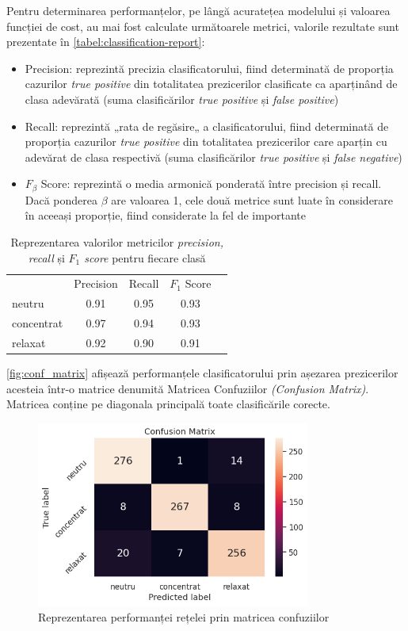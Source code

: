Pentru determinarea performanțelor, pe lângă acuratețea modelului și valoarea funcției de cost, au mai fost calculate următoarele metrici, valorile rezultate sunt prezentate în \autoref{tabel:classification-report}:
\begin{itemize}
\item Precision: reprezintă precizia clasificatorului, fiind determinată de proporția cazurilor \textit{true positive} din totalitatea prezicerilor clasificate ca aparținând de clasa adevărată (suma clasificărilor \textit{true positive} și \textit{false positive})
\item Recall: reprezintă „rata de regăsire„ a clasificatorului, fiind determinată de proporția cazurilor \textit{true positive} din totalitatea prezicerilor care aparțin cu adevărat de clasa respectivă (suma clasificărilor \textit{true positive} și \textit{false negative})
\item $F_\beta$ Score: reprezintă o media armonică ponderată între precision și recall. Dacă ponderea $\beta$ are valoarea 1, cele două metrice sunt luate în considerare în aceeași proporție, fiind considerate la fel de importante
\end{itemize}

\begin{table}[ht]
\centering
\caption{Reprezentarea valorilor metricilor \textit{precision, recall} și \textit{$F_1$ score} pentru fiecare clasă}
\label{tabel:classification-report}
\renewcommand{\arraystretch}{1.2}
\begin{tabular}{@{}lcccc@{}}
\rowcolor{gray!50}\cellcolor{white} & Precision & Recall & $F_1$ Score \\ %
neutru & 0.91 & 0.95 & 0.93 \\
concentrat & 0.97 & 0.94 & 0.93 \\
relaxat & 0.92 & 0.90 & 0.91 \\ \bottomrule
\end{tabular}
\end{table}

\autoref{fig:conf_matrix} afișează performanțele clasificatorului prin așezarea prezicerilor acesteia într-o matrice denumită Matricea Confuziilor \textit{(Confusion Matrix)}. Matricea conține pe diagonala principală toate clasificările corecte.

\begin{figure}[H]
\centering
\includegraphics[width=9cm, keepaspectratio]{fig/cap3/conf_matrix.png}
\caption{Reprezentarea performanței rețelei prin matricea confuziilor}\label{fig:conf_matrix}
\end{figure}

